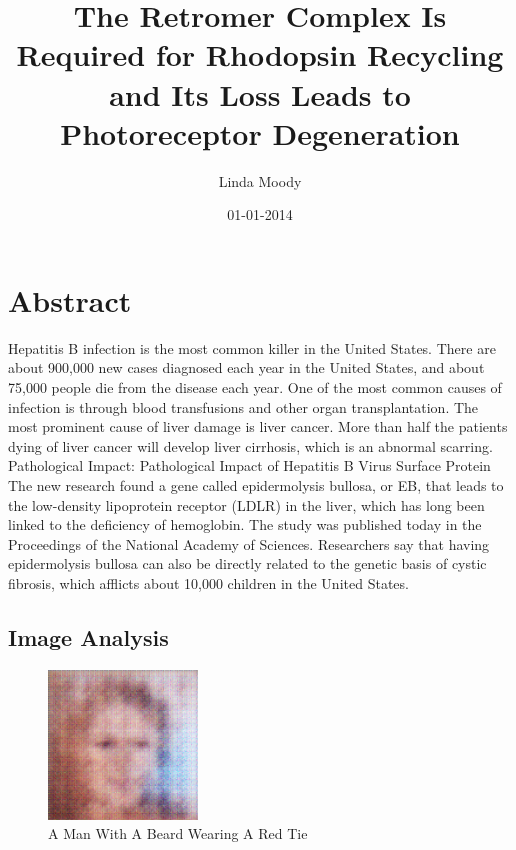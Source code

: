 \documentclass{article}%
\title{The Retromer Complex Is Required for Rhodopsin Recycling and Its Loss Leads to Photoreceptor Degeneration}%
\author{Linda Moody}%
\affil{Neurophysiology Laboratory, Department of Pharmacology and Experimental Neuroscience, University of Nebraska Medical Center, Omaha, Nebraska, United States of America}%
\date{01{-}01{-}2014}%
\begin{document}
%
\normalsize%
\maketitle%
\section{Abstract}%
\label{sec:Abstract}%
Hepatitis B infection is the most common killer in the United States. There are about 900,000 new cases diagnosed each year in the United States, and about 75,000 people die from the disease each year.\newline%
One of the most common causes of infection is through blood transfusions and other organ transplantation.\newline%
The most prominent cause of liver damage is liver cancer. More than half the patients dying of liver cancer will develop liver cirrhosis, which is an abnormal scarring.\newline%
Pathological Impact: Pathological Impact of Hepatitis B Virus Surface Protein\newline%
The new research found a gene called epidermolysis bullosa, or EB, that leads to the low{-}density lipoprotein receptor (LDLR) in the liver, which has long been linked to the deficiency of hemoglobin.\newline%
The study was published today in the Proceedings of the National Academy of Sciences.\newline%
Researchers say that having epidermolysis bullosa can also be directly related to the genetic basis of cystic fibrosis, which afflicts about 10,000 children in the United States.

%
\subsection{Image Analysis}%
\label{subsec:ImageAnalysis}%


\begin{figure}[h!]%
\centering%
\includegraphics[width=150px]{500_fake_images/samples_5_117.png}%
\caption{A Man With A Beard Wearing A Red Tie}%
\end{figure}

%
\end{document}
